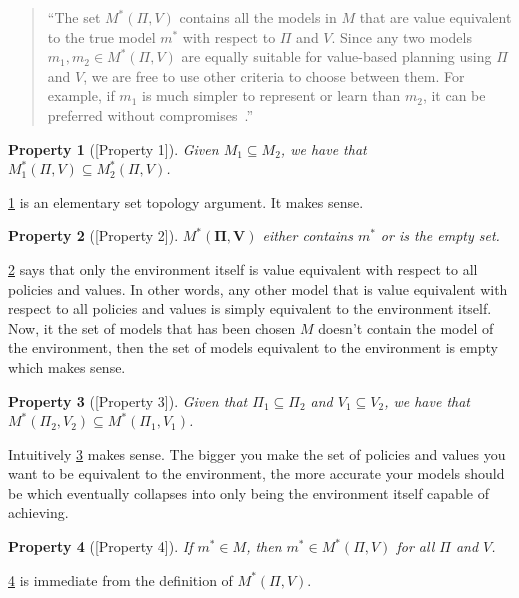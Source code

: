 \documentclass[a4paper]{article}
\theoremstyle{definition}
\theoremstyle{remark}
\theoremstyle{plain}
\newtheorem{property}{Property}
\newcommand{\bV}{\mathbf{V}}
\newcommand{\bPi}{\mathbf{\Pi}}
\begin{document}
%
\begin{quote}
    ``The set $M^*(\Pi, V)$ contains all the models in $M$ that are value equivalent to the true model $m^*$ with respect to $\Pi$ and $V$. Since any two models $m_1, m_2 \in M^*(\Pi, V)$ are equally suitable for value-based planning using $\Pi$ and $V$, we are free to use other criteria to choose between them. For example, if $m_1$ is much simpler to represent or learn than $m_2$, it can be preferred without compromises~\citep{grimm2020value}.''
\end{quote}
%
\begin{property}[{\normalfont\citet{grimm2020value}[Property 1]}]
    \label{prpty:sbst}
    Given $M_1 \subseteq M_2$, we have that $M^*_1(\Pi, V) \subseteq M^*_2(\Pi, V)$.
\end{property}
\cref{prpty:sbst} is an elementary set topology argument. It makes sense. 
%
\begin{property}[{\normalfont\citet{grimm2020value}[Property 2]}]
    \label{prpty:m-str}
    $M^*(\bPi, \bV)$ either contains $m^*$ or is the empty set.
\end{property}
\cref{prpty:m-str} says that only the environment itself is value equivalent with respect to all policies and values. In other words, any other model that is value equivalent with respect to all policies and values is simply equivalent to the environment itself. Now, it the set of models that has been chosen $M$ doesn't contain the model of the environment, then the set of models equivalent to the environment is empty which makes sense.
%
\begin{property}[{\normalfont\citet{grimm2020value}[Property 3]}]
\label{prpty:plcy-vl-size}
Given that $\Pi_1 \subseteq \Pi_2$ and $V_1 \subseteq V_2$, we have that $M^*(\Pi_2, V_2) \subseteq M^*(\Pi_1, V_1)$.
\end{property}
Intuitively \cref{prpty:plcy-vl-size} makes sense. The bigger you make the set of policies and values you want to be equivalent to the environment, the more accurate your models should be which eventually collapses into only being the environment itself capable of achieving.  
%
\begin{property}[{\normalfont\citet{grimm2020value}[Property 4]}]
\label{prprty:m-star-in-M}
If $m^* \in M$, then $m^* \in M^*(\Pi, V)$ for all $\Pi$ and $V$.
\end{property}
\cref{prprty:m-star-in-M} is immediate from the definition of $M^*(\Pi, V)$.
\end{document}
